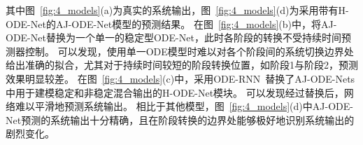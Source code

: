其中图~\ref{fig:4_models}(a)为真实的系统输出，图~\ref{fig:4_models}(d)为采用带有H-ODE-Net的AJ-ODE-Net模型的预测结果。
在图~\ref{fig:4_models}(b)中，将AJ-ODE-Net替换为一个单一的稳定型ODE-Net，此时各阶段的转换不受持续时间预测器控制。
可以发现，使用单一ODE模型时难以对各个阶段间的系统切换边界处给出准确的拟合，尤其对于持续时间较短的阶段转换位置，如阶段1与阶段2，预测效果明显较差。
在图~\ref{fig:4_models}(c)中，采用ODE-RNN~\cite{10.5555/3454287.3454765}替换了AJ-ODE-Nets中用于建模稳定和非稳定混合输出的H-ODE-Net模块。
可以发现经过替换后，网络难以平滑地预测系统输出。
相比于其他模型，图~\ref{fig:4_models}(d)中AJ-ODE-Net预测的系统输出十分精确，且在阶段转换的边界处能够极好地识别系统输出的剧烈变化。
